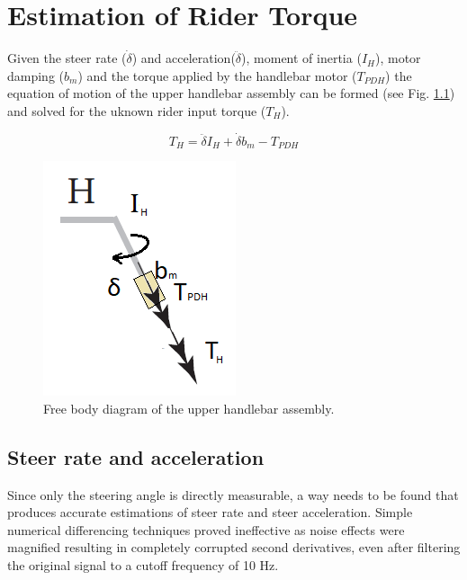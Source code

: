 \chapter{Estimation of Rider Torque}\label{app:C}

Given  the steer rate (\ensuremath{\dot{\delta}}) and acceleration(\ensuremath{\ddot{\delta}}), moment of inertia (\ensuremath{I_H}), motor damping  (\ensuremath{b_m}) and the torque applied by the handlebar motor (\ensuremath{T_{PDH}}) the equation of motion of the upper handlebar assembly can be formed (see Fig. \ref{fig:free_handle}) and solved for the uknown rider input torque (\ensuremath{T_H}).

\begin{equation}
    T_{H}= \ddot{\delta}I_H+\dot{\delta}b_{m} -T_{PDH} 
    \label{eq:torque_rider}
\end{equation}
\begin{figure}[h]
    \centering 
    \captionsetup{justification=centering,margin=2cm}

    \captionsetup{justification=centering,margin=2cm}
    \includegraphics[scale=0.9]{images/free_handle.png}
    \caption[Short title]{Free body diagram of the upper handlebar assembly. }
    \label{fig:free_handle}
\end{figure}

\section{Steer rate and acceleration} \label{sec:rateAccel}
Since only the steering angle is directly measurable, a way needs to be found that produces accurate estimations of steer rate and steer acceleration. Simple numerical differencing techniques proved ineffective as noise effects were magnified resulting in completely corrupted second derivatives, even after filtering the original signal to a cutoff frequency of 10 Hz. 

